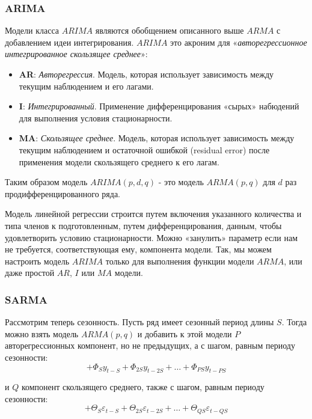 \subsubsection{ARIMA}

Модели класса $ARIMA$ являются обобщением описанного выше $ARMA$ с добавлением идеи интегрирования. $ARIMA$ это 
акроним для «\textit{авторегрессионное интегрированное скользящее среднее}»\cite{Forecasting_Brownlee}:
\begin{itemize}
    \item \textbf{AR}: \textit{Авторегрессия}. Модель, которая использует зависимость между текущим наблюдением и его лагами. \\[-1em]
    \item \textbf{I}: \textit{Интегрированный}. Применение дифференцирования «сырых» набюдений для выполнения условия стационарности. \\[-1em]
    \item \textbf{MA}: \textit{Скользящее среднее}. Модель, которая использует зависимость между текущим наблюдением и остаточной ошибкой (residual error) после применения модели скользящего среднего к его лагам.
\end{itemize}

Таким образом модель $ARIMA(p, d, q)$ - это модель $ARMA(p, q)$ для $d$ раз продифференцированного ряда. 

Модель линейной регрессии строится путем включения указанного количества и типа членов к подготовленным, путем 
дифференцирования, данным, чтобы удовлетворить условию стационарности. Можно «занулить» параметр если нам не 
требуется, соответствующая ему, компонента модели. Так, мы можем настроить модель $ARIMA$ только для выполнения 
функции модели $ARMA$, или даже простой $AR$, $I$ или $MA$ модели. 

\subsubsection{SARMA}

Рассмотрим теперь сезонность. Пусть ряд имеет сезонный период длины $S$. Тогда можно взять модель 
$ARMA(p, q)$ и добавить к этой модели $P$ авторегрессионных компонент, но не предыдущих, а с шагом, равным периоду 
сезонности: 
\begin{equation*}
    + \Phi_S y_{t-S} + \Phi_{2S} y_{t-2S} + \dots + \Phi_{PS} y_{t-PS}
\end{equation*}

и $Q$ компонент скользящего среднего, также с шагом, равным периоду сезонности:
\begin{equation*}
    + \Theta_S \varepsilon_{t-S} + \Theta_{2S} \varepsilon_{t-2S} + \dots + \Theta_{QS} \varepsilon_{t-QS}
\end{equation*}

